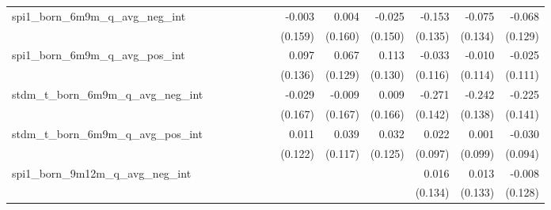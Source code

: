 \begin{tabular}{lrrrrrrrrrrrr}
spi1\_born\_6m9m\_q\_avg\_neg\_int          &              &              &              &              &              &              &       -0.003 &        0.004 &       -0.025 &       -0.153 &       -0.075 &       -0.068 \\ 
                                            &              &              &              &              &              &              &      (0.159) &      (0.160) &      (0.150) &      (0.135) &      (0.134) &      (0.129) \\ 
spi1\_born\_6m9m\_q\_avg\_pos\_int          &              &              &              &              &              &              &        0.097 &        0.067 &        0.113 &       -0.033 &       -0.010 &       -0.025 \\ 
                                            &              &              &              &              &              &              &      (0.136) &      (0.129) &      (0.130) &      (0.116) &      (0.114) &      (0.111) \\ 
stdm\_t\_born\_6m9m\_q\_avg\_neg\_int       &              &              &              &              &              &              &       -0.029 &       -0.009 &        0.009 &       -0.271 &       -0.242 &       -0.225 \\ 
                                            &              &              &              &              &              &              &      (0.167) &      (0.167) &      (0.166) &      (0.142) &      (0.138) &      (0.141) \\ 
stdm\_t\_born\_6m9m\_q\_avg\_pos\_int       &              &              &              &              &              &              &        0.011 &        0.039 &        0.032 &        0.022 &        0.001 &       -0.030 \\ 
                                            &              &              &              &              &              &              &      (0.122) &      (0.117) &      (0.125) &      (0.097) &      (0.099) &      (0.094) \\ 
spi1\_born\_9m12m\_q\_avg\_neg\_int         &              &              &              &              &              &              &              &              &              &        0.016 &        0.013 &       -0.008 \\ 
                                            &              &              &              &              &              &              &              &              &              &      (0.134) &      (0.133) &      (0.128) \\ 

\end{tabular}
